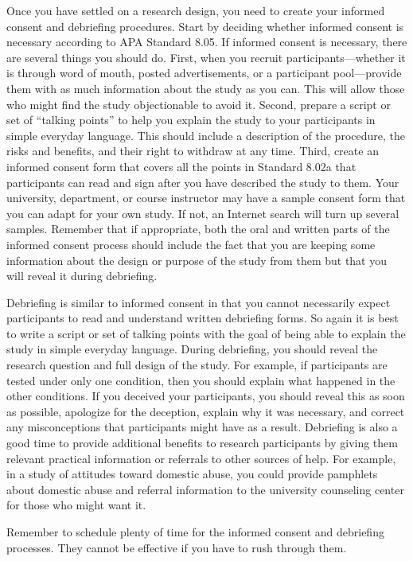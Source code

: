 \documentclass[
]{krantz}
\begin{document}
Once you have settled on a research design, you need to create your informed consent and debriefing procedures. Start by deciding whether informed consent is necessary according to APA Standard 8.05. If informed consent is necessary, there are several things you should do. First, when you recruit participants---whether it is through word of mouth, posted advertisements, or a participant pool---provide them with as much information about the study as you can. This will allow those who might find the study objectionable to avoid it. Second, prepare a script or set of ``talking points'' to help you explain the study to your participants in simple everyday language. This should include a description of the procedure, the risks and benefits, and their right to withdraw at any time. Third, create an informed consent form that covers all the points in Standard 8.02a that participants can read and sign after you have described the study to them. Your university, department, or course instructor may have a sample consent form that you can adapt for your own study. If not, an Internet search will turn up several samples. Remember that if appropriate, both the oral and written parts of the informed consent process should include the fact that you are keeping some information about the design or purpose of the study from them but that you will reveal it during debriefing.

Debriefing is similar to informed consent in that you cannot necessarily expect participants to read and understand written debriefing forms. So again it is best to write a script or set of talking points with the goal of being able to explain the study in simple everyday language. During debriefing, you should reveal the research question and full design of the study. For example, if participants are tested under only one condition, then you should explain what happened in the other conditions. If you deceived your participants, you should reveal this as soon as possible, apologize for the deception, explain why it was necessary, and correct any misconceptions that participants might have as a result. Debriefing is also a good time to provide additional benefits to research participants by giving them relevant practical information or referrals to other sources of help. For example, in a study of attitudes toward domestic abuse, you could provide pamphlets about domestic abuse and referral information to the university counseling center for those who might want it.

Remember to schedule plenty of time for the informed consent and debriefing processes. They cannot be effective if you have to rush through them.
\end{document}
